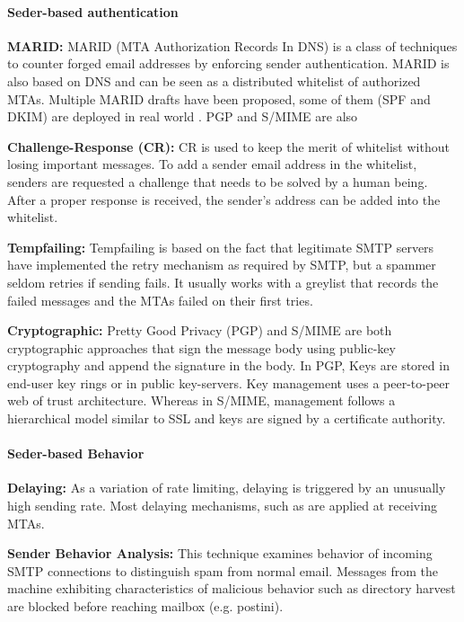 \paragraph{Seder-based authentication}

		\textbf{MARID:} MARID (MTA Authorization Records In DNS) is a class of techniques to counter forged email addresses by enforcing sender authentication.
		MARID is also based on DNS and can be seen as a distributed whitelist of authorized MTAs.
		Multiple MARID drafts have been proposed,
			some of them (SPF and DKIM) are deployed in real world \cite{spf:_2018, BibEntry2014Dec}.
			PGP and S/MIME are also

		\textbf{Challenge-Response (CR):} CR is used to keep the merit of whitelist without losing important messages.
		To add a sender email address in the whitelist,
			senders are requested a challenge that needs to be solved by a human being.
		After a proper response is received,
			the sender’s address can be added into the whitelist.

		\textbf{Tempfailing:} Tempfailing \cite{twining_email_2004} is based on the fact that legitimate SMTP servers have implemented the retry mechanism as required by SMTP,
			but a spammer seldom retries if sending fails.
		It usually works with a greylist that records the failed messages and the MTAs failed on their first tries.

		\textbf{Cryptographic:}
		Pretty Good Privacy (PGP) \cite{pgp_2007} and S/MIME are both cryptographic approaches that sign the message body using public-key cryptography and append the signature in the body.
		In PGP,
			Keys are stored in end-user key rings or in public key-servers.
		Key management uses a peer-to-peer web of trust architecture.
		Whereas in S/MIME,
			management follows a hierarchical model similar to SSL and keys are signed by a certificate authority.

\paragraph{Seder-based Behavior}

		\textbf{Delaying:} As a variation of rate limiting,
			delaying is triggered by an unusually high sending rate.
		Most delaying mechanisms,
			such as \cite{diego_distributed_2003} are applied at receiving MTAs.

		\textbf{Sender Behavior Analysis:} This technique examines behavior of incoming SMTP connections to distinguish spam from normal email.
		Messages from the machine exhibiting characteristics of malicious behavior such as directory harvest are blocked before reaching mailbox (e.g. postini).

